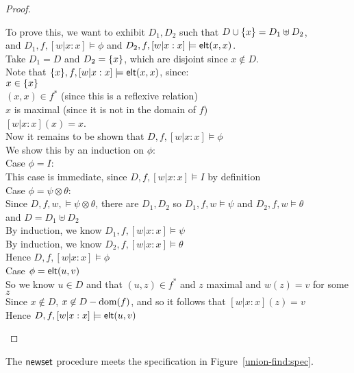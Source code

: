 \begin{proof}
\begin{tabbedproof}
\oo To prove this, we want to exhibit $D_1, D_2$ such that $D \cup \{{x}\} = D_1 \uplus D_2$, \\
\ox and $D_1, f, [w|x:x] \models \phi$ and $D_2, f, [w|x:x] \models \mathsf{elt}({x}, {x})$. \\ 
\oo Take $D_1 = D$ and $D_2 = \{{x}\}$, which are disjoint since $x \not\in D$. \\ 
\oo Note that $\{{x}\}, f, [w|x:x] \models \mathsf{elt}({x}, {x})$, since:  \\
\oox $x \in \{{x}\}$  \\
\oox $(x, x) \in f^*$ (since this is a reflexive relation) \\
\oox $x$ is maximal (since it is not in the domain of $f$) \\
\oox $[w|x:x](x) = x$. \\
\oo Now it remains to be shown that $D, f, [w|x:x] \models \phi$ \\
\oo We show this by an induction on $\phi$:  \\
\ooo Case $\phi = I$:\\ 
\oooo This case is immediate, since $D, f, [w|x:x] \models I$ by definition \\ 
\ooo Case $\phi = \psi \otimes \theta$: \\    
\oooo Since $D, f, w, \models \psi \otimes \theta$, there are $D_1, D_2$ so $D_1, f, w \models \psi$ and $D_2, f, w \models \theta$ \\
\ooox and $D = D_1 \uplus D_2$ \\
\oooo By induction, we know $D_1, f, [w|x:x] \models \psi$ \\ 
\oooo By induction, we know $D_2, f, [w|x:x] \models \theta$ \\
\oooo Hence $D, f, [w|x:x] \models \phi$ \\
\ooo Case $\phi = \mathsf{elt}({u}, {v})$ \\
\oooo So we know $u \in D$ and that $(u,z) \in f^{*}$ and $z$ maximal and $w(z) = v$ for some $z$ \\
\oooo Since $x \not \in D$, $x \not\in D - \mbox{dom}({f})$, and so it follows that $[w|x:x](z) = v$ \\
\oooo Hence $D, f, [w|x:x] \models \mathsf{elt}({u}, {v})$ 
\end{tabbedproof}
\end{proof}

\begin{lemma}
The $\mathsf{newset}$ procedure meets the specification in Figure~\ref{union-find:spec}. 
\end{lemma}

